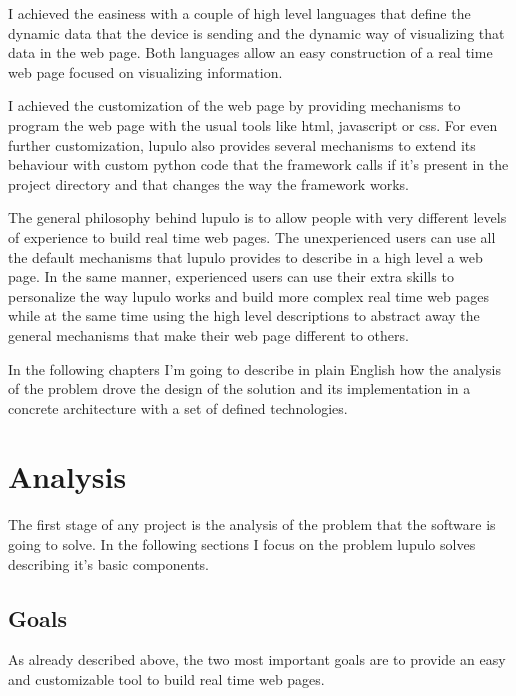 \documentclass[12pt]{article}
\begin{document}
            I achieved the easiness with a couple of high level languages that
            define the dynamic data that the device is sending and the dynamic
            way of visualizing that data in the web page. Both languages allow
            an easy construction of a real time web page focused on visualizing
            information.

            I achieved the customization of the web page by providing mechanisms
            to program the web page with the usual tools like html, javascript
            or css. For even further customization, lupulo also provides several
            mechanisms to extend its behaviour with custom python code that the
            framework calls if it's present in the project directory and that
            changes the way the framework works.

            The general philosophy behind lupulo is to allow people with very
            different levels of experience to build real time web pages. The
            unexperienced users can use all the default mechanisms that lupulo
            provides to describe in a high level a web page. In the same manner,
            experienced users can use their extra skills to personalize the way
            lupulo works and build more complex real time web pages while at the
            same time using the high level descriptions to abstract away the
            general mechanisms that make their web page different to others.

            In the following chapters I'm going to describe in plain English
            how the analysis of the problem drove the design of the solution and
            its implementation in a concrete architecture with a set of
            defined technologies.

    \section{Analysis}
        The first stage of any project is the analysis of the problem that the
        software is going to solve. In the following sections I focus on the
        problem lupulo solves describing it's basic components.

        \subsection{Goals}
            As already described above, the two most important goals are to
            provide an easy and customizable tool to build real time web pages.
\end{document}
